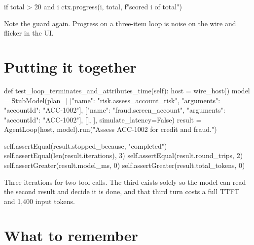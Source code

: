 \begin{py}
if total > 20 and i %
    ctx.progress(i, total, f"scored {i} of {total}")
\end{py}

Note the guard again. Progress on a three-item loop is noise on the wire and
flicker in the UI.

\section{Putting it together}

\begin{py}
def test_loop_terminates_and_attributes_time(self):
    host = wire_host()
    model = StubModel(plan=[
        [{"name": "risk.assess_account_risk",
          "arguments": {"accountId": "ACC-1002"}}],
        [{"name": "fraud.screen_account",
          "arguments": {"accountId": "ACC-1002"}}],
        [],
    ], simulate_latency=False)
    result = AgentLoop(host, model).run("Assess ACC-1002 for credit and fraud.")

    self.assertEqual(result.stopped_because, "completed")
    self.assertEqual(len(result.iterations), 3)
    self.assertEqual(result.round_trips, 2)
    self.assertGreater(result.model_ms, 0)
    self.assertGreater(result.total_tokens, 0)
\end{py}

Three iterations for two tool calls. The third exists solely so the model can
read the second result and decide it is done, and that third turn costs a full
TTFT and 1,400 input tokens.


\section{What to remember}

